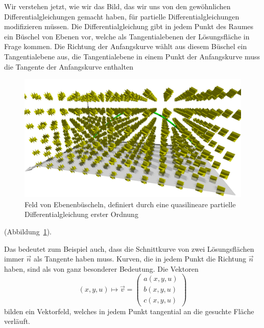Wir verstehen jetzt, wie wir das Bild, das wir uns von den gewöhnlichen
Differentialgleichungen gemacht haben, für partielle Differentialgleichungen
modifizieren müssen. Die Differentialgleichung gibt in jedem Punkt
des Raumes ein Büschel von Ebenen vor, welche als Tangentialebenen der
Lösungsfläche in Frage kommen. Die Richtung der Anfangskurve wählt aus
diesem Büschel ein Tangentialebene aus, die Tangentialebene in einem 
Punkt der Anfangskurve muss die Tangente der Anfangskurve enthalten
\begin{figure}
\begin{center}
\includegraphics[width=\hsize]{3d/planes.jpg}
\end{center}
\caption{Feld von Ebenenbüscheln, definiert durch eine quasilineare
partielle Differentialgleichung erster Ordnung
\label{geometrie:ebenenbueschelfeld}}
\end{figure}
(Abbildung~\ref{geometrie:ebenenbueschelfeld}).

Das bedeutet zum Beispiel auch, dass die Schnittkurve von
zwei Lösungsflächen immer $\vec n$ als Tangente haben muss.
Kurven, die in jedem Punkt die Richtung $\vec n$ haben, sind
als von ganz besonderer Bedeutung.
Die Vektoren
\[
(x,y,u)\mapsto
\vec v=
\begin{pmatrix}
a(x,y,u)\\b(x,y,u)\\c(x,y,u)
\end{pmatrix}
\]
bilden ein Vektorfeld, welches in jedem Punkt tangential
an die gesuchte Fläche verläuft.

